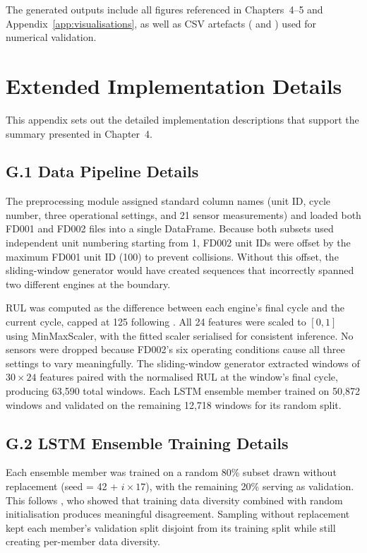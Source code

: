 \documentclass[12pt,a4paper]{report}
\begin{document}
The generated outputs include all figures referenced in Chapters~4--5 and Appendix~\ref{app:visualisations}, as well as CSV artefacts ( and ) used for numerical validation.




\chapter{Extended Implementation Details}
\label{app:impl_details}

This appendix sets out the detailed implementation descriptions that support the summary presented in Chapter~4.

\section*{G.1 Data Pipeline Details}

The preprocessing module assigned standard column names (unit ID, cycle number, three operational settings, and 21 sensor measurements) and loaded both FD001 and FD002 files into a single DataFrame. Because both subsets used independent unit numbering starting from 1, FD002 unit IDs were offset by the maximum FD001 unit ID (100) to prevent collisions. Without this offset, the sliding-window generator would have created sequences that incorrectly spanned two different engines at the boundary.

RUL was computed as the difference between each engine's final cycle and the current cycle, capped at 125 following \citet{heimes2008recurrent}. All 24 features were scaled to $[0, 1]$ using MinMaxScaler, with the fitted scaler serialised for consistent inference. No sensors were dropped because FD002's six operating conditions cause all three settings to vary meaningfully. The sliding-window generator extracted windows of $30 \times 24$ features paired with the normalised RUL at the window's final cycle, producing 63,590 total windows. Each LSTM ensemble member trained on 50,872 windows and validated on the remaining 12,718 windows for its random split.

\section*{G.2 LSTM Ensemble Training Details}

Each ensemble member was trained on a random 80\% subset drawn without replacement (seed = 42 + $i \times 17$), with the remaining 20\% serving as validation. This follows \citet{fort2019deep}, who showed that training data diversity combined with random initialisation produces meaningful disagreement. Sampling without replacement kept each member's validation split disjoint from its training split while still creating per-member data diversity.
\end{document}
